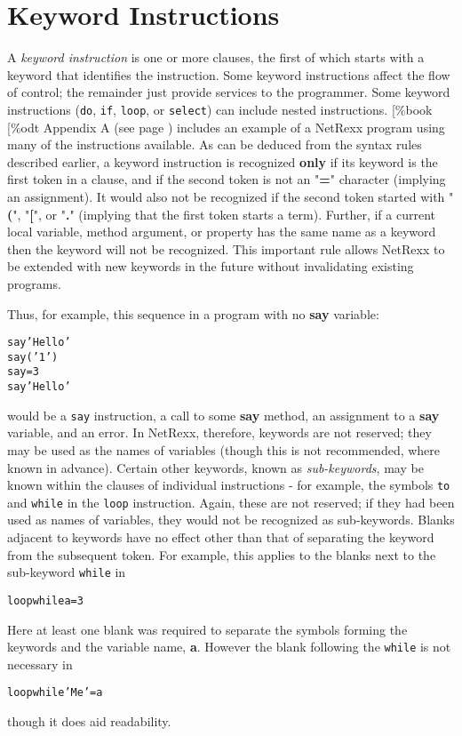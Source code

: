 \chapter{Keyword Instructions}\label{"id"}
 A \emph{keyword instruction} is one or more clauses, the first of
which starts with a keyword that identifies the instruction.
Some keyword instructions affect the flow of control; the remainder
just provide services to the programmer.
Some keyword instructions (\texttt{do}, \texttt{if}, \texttt{loop}, or
\texttt{select}) can include nested instructions.
[\%book
[\%odt
 Appendix A (see page \pageref{refappa})  includes an example of a NetRexx program
using many of the instructions available.
 As can be deduced from the syntax rules described earlier, a keyword
instruction is recognized \textbf{only} if its keyword is the first
token in a clause, and if the second token is not an "\textbf{=}"
character (implying an assignment).
It would also not be recognized if the second token started
with "\textbf{(}", "\textbf{[}",
or "\textbf{.}" (implying that the first token starts a term).
 Further, if a current local variable, method argument, or property
has the same name as a keyword then the keyword will not be recognized.
This important rule allows NetRexx to be extended with new keywords in
the future without invalidating existing programs.
 
Thus, for example, this sequence in a program with no \textbf{say}
variable:
\begin{alltt}
say 'Hello'
say('1')
say=3
say 'Hello'
\end{alltt}
would be a \texttt{say} instruction, a call to some \textbf{say}
method, an assignment to a \textbf{say} variable, and an error.
 In NetRexx, therefore, keywords are not reserved; they may be used as
the names of variables (though this is not recommended, where known in
advance).
 Certain other keywords, known as \emph{sub-keywords}, may be
known within the clauses of individual instructions - for
example, the symbols \texttt{to} and \texttt{while} in the \texttt{loop}
instruction.  Again, these are not reserved; if they had been used as
names of variables, they would not be recognized as sub-keywords.
 Blanks adjacent to keywords have no effect other than that of
separating the keyword from the subsequent token.
For example, this applies to the blanks next to the sub-keyword
\texttt{while} in
\begin{alltt}
loop  while  a=3
\end{alltt}
Here at least one blank was required to separate the symbols
forming the keywords and the variable name, \textbf{a}.  However the
blank following the \texttt{while} is not necessary in
\begin{alltt}
loop while 'Me'=a
\end{alltt}
though it does aid readability.

